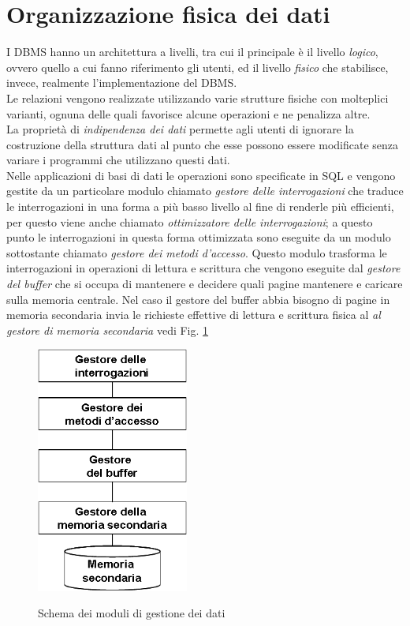 \label{capitolo5}
\section{Organizzazione fisica dei dati}
I DBMS hanno un architettura a livelli, tra cui il principale è il livello \emph{logico}, ovvero quello a cui fanno riferimento gli utenti, ed il livello \emph{fisico} che stabilisce, invece, realmente l'implementazione del DBMS.\\
Le relazioni vengono realizzate utilizzando varie strutture fisiche con molteplici varianti, ognuna delle quali favorisce alcune operazioni e ne penalizza altre.\\
La proprietà di \emph{indipendenza dei dati} permette agli utenti di ignorare la costruzione della struttura dati al punto che esse possono essere modificate senza variare i programmi che utilizzano questi dati.\\
Nelle applicazioni di basi di dati le operazioni sono specificate in SQL e vengono gestite da un particolare modulo chiamato \emph{gestore delle interrogazioni} che traduce le interrogazioni in una forma a più basso livello al fine di renderle più efficienti, per questo viene anche chiamato \emph{ottimizzatore delle interrogazioni}; a questo punto le interrogazioni in questa forma ottimizzata sono eseguite da un modulo sottostante chiamato \emph{gestore dei metodi d'accesso}. Questo modulo trasforma le interrogazioni in operazioni di lettura e scrittura che vengono eseguite dal \emph{gestore del buffer} che si occupa di mantenere e decidere quali pagine mantenere e caricare sulla memoria centrale. Nel caso il gestore del buffer abbia bisogno di pagine in memoria secondaria invia le richieste effettive di lettura e scrittura fisica al \emph{al gestore di memoria secondaria} vedi Fig. \ref{fig:schemod}
\begin{figure}
  \centering
  \includegraphics[width=5cm]{img/memsec.png}\\
  \caption{Schema dei moduli di gestione dei dati}\label{fig:schemod}
\end{figure}
